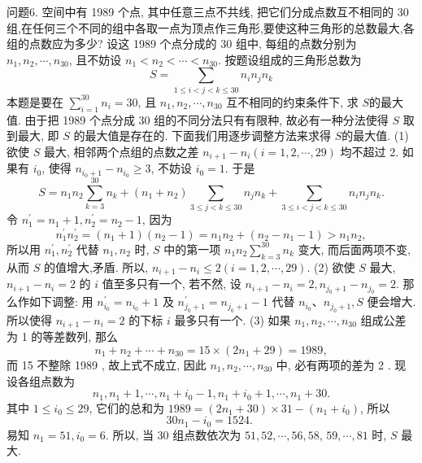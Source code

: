 问题6. 空间中有 1989 个点, 其中任意三点不共线, 把它们分成点数互不相同的 30 组,在任何三个不同的组中各取一点为顶点作三角形,要使这种三角形的总数最大,各组的点数应为多少?
设这 1989 个点分成的 30 组中, 每组的点数分别为 $n_1, n_2, \cdots, n_{30}$, 且不妨设 $n_1<n_2<\cdots<n_{30}$. 按题设组成的三角形总数为
$$
S=\sum_{1 \leqslant i<j<k \leqslant 30} n_i n_j n_k
$$
本题是要在 $\sum_{i=1}^{30} n_i=30$, 且 $n_1, n_2, \cdots, n_{30}$ 互不相同的约束条件下, 求 $S$的最大值.
由于把 1989 个点分成 30 组的不同分法只有有限种, 故必有一种分法使得 $S$ 取到最大, 即 $S$ 的最大值是存在的.
下面我们用逐步调整方法来求得 $S$的最大值.
(1) 欲使 $S$ 最大, 相邻两个点组的点数之差 $n_{i+1}-n_i(i=1,2, \cdots, 29)$ 均不超过 2. 如果有 $i_0$, 使得 $n_{i_0+1}-n_{i_0} \geqslant 3$, 不妨设 $i_0=1$. 于是
$$
S=n_1 n_2 \sum_{k=3}^{30} n_k+\left(n_1+n_2\right) \sum_{3 \leqslant j<k \leqslant 30} n_j n_k+\sum_{3 \leqslant i<j<k \leqslant 30} n_i n_j n_k .
$$
令 $n_1^{\prime}=n_1+1, n_2^{\prime}=n_2-1$, 因为
$$
n_1^{\prime} n_2^{\prime}=\left(n_1+1\right)\left(n_2-1\right)=n_1 n_2+\left(n_2-n_1-1\right)>n_1 n_2,
$$
所以用 $n_1^{\prime}, n_2^{\prime}$ 代替 $n_1, n_2$ 时, $S$ 中的第一项 $n_1 n_2 \sum_{k=3}^{30} n_k$ 变大, 而后面两项不变, 从而 $S$ 的值增大,矛盾.
所以, $n_{i+1}-n_i \leqslant 2(i=1,2, \cdots, 29)$.
(2) 欲使 $S$ 最大, $n_{i+1}-n_i=2$ 的 $i$ 值至多只有一个, 若不然, 设 $n_{i+1}- n_i=2, n_{j_0+1}-n_{j_0}=2$. 那么作如下调整: 用 $n_{i_0}^{\prime}=n_{i_0}+1$ 及 $n_{j_0+1}^{\prime}=n_{j_0+1}-1$ 代替 $n_{i_0} 、 n_{j_0+1}, S$ 便会增大.
所以使得 $n_{i+1}-n_i=2$ 的下标 $i$ 最多只有一个.
(3) 如果 $n_1, n_2, \cdots, n_{30}$ 组成公差为 1 的等差数列, 那么
$$
n_1+n_2+\cdots+n_{30}=15 \times\left(2 n_1+29\right)=1989,
$$
而 15 不整除 1989 , 故上式不成立, 因此 $n_1, n_2, \cdots, n_{30}$ 中, 必有两项的差为 2 . 现设各组点数为
$$
n_1, n_1+1, \cdots, n_1+i_0-1, n_1+i_0+1, \cdots, n_1+30 .
$$
其中 $1 \leqslant i_0 \leqslant 29$, 它们的总和为 $1989=\left(2 n_1+30\right) \times 31-\left(n_1+i_0\right)$, 所以
$$
30 n_1-i_0=1524 \text {. }
$$
易知 $n_1=51, i_0=6$. 所以, 当 30 组点数依次为 $51,52, \cdots, 56,58$, $59, \cdots, 81$ 时, $S$ 最大.



